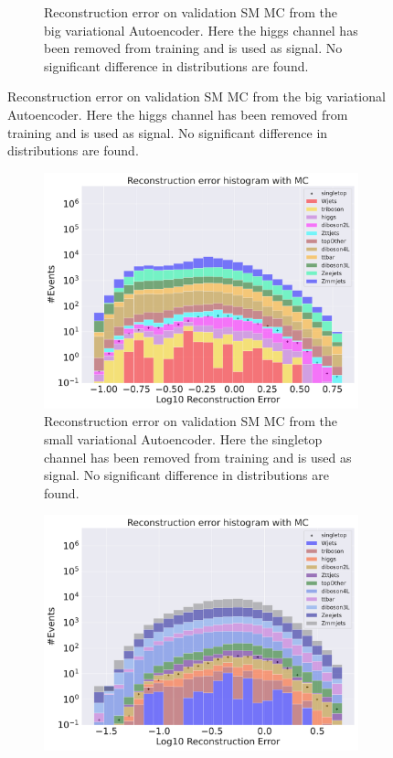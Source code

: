 \begin{figure}[h!]
\begin{subfigure}{.45\textwidth}
        \caption{Reconstruction error on validation SM MC from the big variational Autoencoder. Here the higgs channel has been removed from training and 
        is used as signal. No significant difference in distributions are found. }
        \label{fig:vae_big_higgs}
    \end{subfigure}
    \hfill  
    \label{fig:vae_big_channel_1}
\end{figure}

\begin{figure}[h!]
    \centering
    \begin{subfigure}{.45\textwidth}
        \includegraphics[width=\textwidth]{Figures/VAE_testing/small/b_data_recon_big_rm3_feats_sig_singletop.pdf}
        \caption{Reconstruction error on validation SM MC from the small variational Autoencoder. Here the singletop channel has been removed from training and 
        is used as signal. No significant difference in distributions are found. }
        \label{fig:vae_small_singletop}
    \end{subfigure}
    \hfill
    \begin{subfigure}{.45\textwidth}
        \includegraphics[width=\textwidth]{Figures/VAE_testing/big/b_data_recon_big_rm3_feats_sig_singletop.pdf}

\end{subfigure}
\end{figure}
